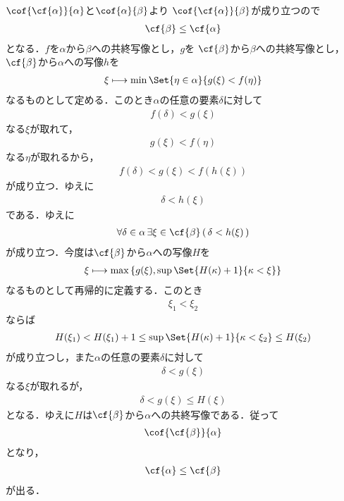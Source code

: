 	\begin{sketch}
		$\cof{\cf{\alpha}}{\alpha}$と$\cof{\alpha}{\beta}$より
		$\cof{\cf{\alpha}}{\beta}$が成り立つので
		\begin{align}
			\cf{\beta} \leq \cf{\alpha}
		\end{align}
		となる．$f$を$\alpha$から$\beta$への共終写像とし，$g$を
		$\cf{\beta}$から$\beta$への共終写像とし，$\cf{\beta}$から$\alpha$への写像$h$を
		\begin{align}
			\xi \longmapsto \min{\Set{\eta \in \alpha}{g(\xi) < f(\eta)}}
		\end{align}
		なるものとして定める．このとき$\alpha$の任意の要素$\delta$に対して
		\begin{align}
			f(\delta) < g(\xi)
		\end{align}
		なる$\xi$が取れて，
		\begin{align}
			g(\xi) < f(\eta)
		\end{align}
		なる$\eta$が取れるから，
		\begin{align}
			f(\delta) < g(\xi) < f(h(\xi))
		\end{align}
		が成り立つ．ゆえに
		\begin{align}
			\delta < h(\xi)
		\end{align}
		である．ゆえに
		\begin{align}
			\forall \delta \in \alpha\, \exists \xi \in \cf{\beta}\, 
			(\, \delta < h(\xi)\, )
		\end{align}
		が成り立つ．今度は$\cf{\beta}$から$\alpha$への写像$H$を
		\begin{align}
			\xi \longmapsto \max{\{g(\xi),\sup{\Set{H(\kappa)+1}{\kappa < \xi}}\}}
		\end{align}
		なるものとして再帰的に定義する．このとき
		\begin{align}
			\xi_{1} < \xi_{2}
		\end{align}
		ならば
		\begin{align}
			H(\xi_{1}) < H(\xi_{1}) + 1 \leq \sup{\Set{H(\kappa)+1}{\kappa < \xi_{2}}}
			\leq H(\xi_{2})
		\end{align}
		が成り立つし，また$\alpha$の任意の要素$\delta$に対して
		\begin{align}
			\delta < g(\xi)
		\end{align}
		なる$\xi$が取れるが，
		\begin{align}
			\delta < g(\xi) \leq H(\xi)
		\end{align}
		となる．ゆえに$H$は$\cf{\beta}$から$\alpha$への共終写像である．従って
		\begin{align}
			\cof{\cf{\beta}}{\alpha}
		\end{align}
		となり，
		\begin{align}
			\cf{\alpha} \leq \cf{\beta}
		\end{align}
		が出る．
		\QED
	\end{sketch}
	
